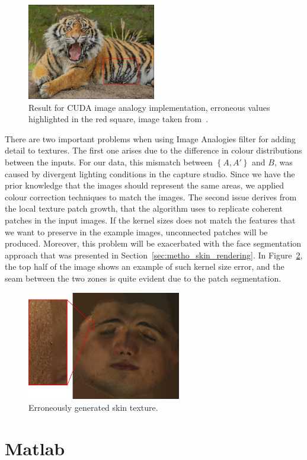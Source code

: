 \begin{figure}[htbp!]
\centering
\includegraphics[width=0.5\textwidth]{img/cuda_error}
	\caption{Result for CUDA image analogy implementation, erroneous values highlighted in the red square, image taken from~\cite{ImAnCudaWeb}.}
	\label{fig:cuda_error}
\end{figure}

There are two important problems when using Image Analogies filter for adding detail to textures.
The first one arises due to the difference in colour distributions between the inputs.
For our data, this mismatch between $\left\lbrace A, A' \right\rbrace$ and $B$, was caused by divergent lighting conditions in the capture studio.
Since we have the prior knowledge that the images should represent the same areas, we applied colour correction techniques to match the images.
The second issue derives from the local texture patch growth, that the algorithm uses to replicate coherent patches in the input images.
If the kernel sizes does not match the features that we want to preserve in the example images, unconnected patches will be produced.
Moreover, this problem will be exacerbated with the face segmentation approach that was presented in Section~\ref{sec:metho_skin_rendering}.
In Figure~\ref{fig:skin_patch_error}, the top half of the image shows an example of such kernel size error, and the seam between the two zones is quite evident due to the patch segmentation.

\begin{figure}[htbp!]
\centering
\includegraphics[width=0.6\textwidth]{img/skin_patch_error}
	\caption{Erroneously generated skin texture.}
	\label{fig:skin_patch_error}
\end{figure}


\section{Matlab}

